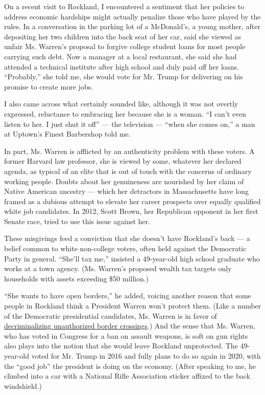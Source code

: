 On a recent visit to Rockland, I encountered a sentiment that her
policies to address economic hardships might actually penalize those who
have played by the rules. In a conversation in the parking lot of a
McDonald's, a young mother, after depositing her two children into the
back seat of her car, said she viewed as unfair Ms. Warren's proposal to
forgive college student loans for most people carrying such debt. Now a
manager at a local restaurant, she said she had attended a technical
institute after high school and duly paid off her loans. ``Probably,''
she told me, she would vote for Mr. Trump for delivering on his promise
to create more jobs.

I also came across what certainly sounded like, although it was not
overtly expressed, reluctance to embracing her because she is a woman.
``I can't even listen to her. I just shut it off'' --- the television
--- ``when she comes on,'' a man at Uptown's Finest Barbershop told me.

In part, Ms. Warren is afflicted by an authenticity problem with these
voters. A former Harvard law professor, she is viewed by some, whatever
her declared agenda, as typical of an elite that is out of touch with
the concerns of ordinary working people. Doubts about her genuineness
are nourished by her claim of Native American ancestry --- which her
detractors in Massachusetts have long framed as a dubious attempt to
elevate her career prospects over equally qualified white job
candidates. In 2012, Scott Brown, her Republican opponent in her first
Senate race, tried to use this issue against her.

These misgivings feed a conviction that she doesn't have Rockland's back
--- a belief common to white non-college voters, often held against the
Democratic Party in general. ``She'll tax me,'' insisted a 49-year-old
high school graduate who works at a town agency. (Ms. Warren's proposed
wealth tax targets only households with assets exceeding \$50 million.)

``She wants to have open borders,'' he added, voicing another reason
that some people in Rockland think a President Warren won't protect
them. (Like a number of the Democratic presidential candidates, Ms.
Warren is in favor of
\href{https://www.nytimes3xbfgragh.onion/2019/07/31/us/border-crossing-decriminalization.html}{decriminalizing
unauthorized border crossings}.) And the sense that Ms. Warren, who has
voted in Congress for a ban on assault weapons, is soft on gun rights
also plays into the notion that she would leave Rockland unprotected.
The 49-year-old voted for Mr. Trump in 2016 and fully plans to do so
again in 2020, with the ``good job'' the president is doing on the
economy. (After speaking to me, he climbed into a car with a National
Rifle Association sticker affixed to the back windshield.)


